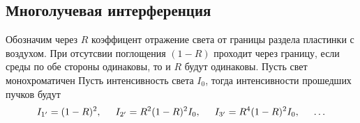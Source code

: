 \subsection{Многолучевая интерференция}


Обозначим через $R$ коэффицент отражение света от границы раздела пластинки с воздухом. При отсутсвии поглощения $(1-R)$ проходит через границу, если среды по обе стороны одинаковы, то и $R$ будут одинаковы. Пусть свет монохроматичен
Пусть интенсивность света $I_0$, тогда интенсивности прошедших пучков будут
\begin{equation*}
    I_{1'} = (1-R)^2, \hspace{5 mm} 
    I_{2'} = R^2(1-R)^2 I_0, \hspace{5 mm} 
    I_{3'} = R^4 (1-R)^2 I_0, \hspace{5 mm}  \ldots
\end{equation*}
